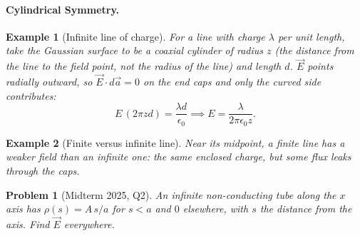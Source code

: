 \documentclass{article}
\newtheorem{problem}{Problem}
\newtheorem*{example}{Example}
\begin{document}
\paragraph{Cylindrical Symmetry.}
\begin{example}[Infinite line of charge]
    For a line with charge $\lambda$ per unit length, take the Gaussian surface to be a coaxial cylinder of radius $z$ (the distance from the line to the field point, not the radius of the line) and length $d$. $\vec{E}$ points radially outward, so $\vec{E}\cdot d\vec{a} = 0$ on the end caps and only the curved side contributes:
    \[E\,(2\pi z d) = \frac{\lambda d}{\epsilon_0} \implies E = \frac{\lambda}{2\pi\epsilon_0 z}.\]
\end{example}
\begin{example}[Finite versus infinite line]
    Near its midpoint, a finite line has a weaker field than an infinite one: the same enclosed charge, but some flux leaks through the caps.
\end{example}
\begin{problem}[Midterm 2025, Q2]
    An infinite non-conducting tube along the $x$ axis has $\rho(s) = A\,s/a$ for $s < a$ and $0$ elsewhere, with $s$ the distance from the axis. Find $\vec{E}$ everywhere.
\end{problem}
\end{document}
